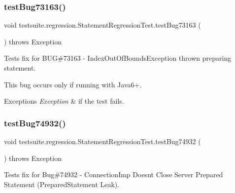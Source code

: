 \subsubsection{\texorpdfstring{test\+Bug73163()}{testBug73163()}}
{\footnotesize\ttfamily void testsuite.\+regression.\+Statement\+Regression\+Test.\+test\+Bug73163 (\begin{DoxyParamCaption}{ }\end{DoxyParamCaption}) throws Exception}

Tests fix for B\+UG\#73163 -\/ Index\+Out\+Of\+Bounds\+Exception thrown preparing statement.

This bug occurs only if running with Java6+.


\begin{DoxyExceptions}{Exceptions}
{\em Exception} & if the test fails. \\
\hline
\end{DoxyExceptions}
\mbox{\label{classtestsuite_1_1regression_1_1_statement_regression_test_a08b73e136a8dc102c6b24d67e1eb88ea}} 
\subsubsection{\texorpdfstring{test\+Bug74932()}{testBug74932()}}
{\footnotesize\ttfamily void testsuite.\+regression.\+Statement\+Regression\+Test.\+test\+Bug74932 (\begin{DoxyParamCaption}{ }\end{DoxyParamCaption}) throws Exception}

Tests fix for Bug\#74932 -\/ Connection\+Imp Doesn\textquotesingle{}t Close Server Prepared Statement (Prepared\+Statement Leak). \mbox{\label{classtestsuite_1_1regression_1_1_statement_regression_test_a785d6999de84a7868d85817387113884}} 
